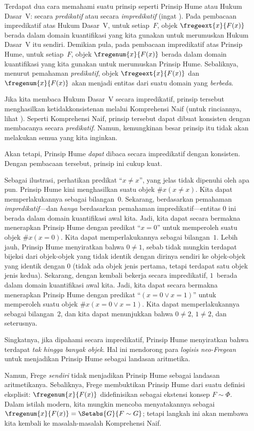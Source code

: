 \documentclass[../../../include/open-logic-section]{subfiles}
\begin{document}
Terdapat dua cara memahami suatu prinsip seperti Prinsip Hume atau Hukum
Dasar~V: secara \emph{predikatif} atau secara \emph{impredikatif} (ingat
). Pada pembacaan impredikatif atas Hukum
Dasar~V, untuk setiap~$F$, objek $\fregeext{x}{F(x)}$ berada dalam domain
kuantifikasi yang kita gunakan untuk merumuskan Hukum Dasar~V itu sendiri.
Demikian pula, pada pembacaan impredikatif atas Prinsip Hume, untuk
setiap~$F$, objek $\fregenum{x}{F(x)}$ berada dalam domain kuantifikasi yang
kita gunakan untuk merumuskan Prinsip Hume. Sebaliknya, menurut pemahaman
\emph{predikatif}, objek $\fregeext{x}{F(x)}$ dan~$\fregenum{x}{F(x)}$ akan
menjadi entitas dari suatu domain yang \emph{berbeda}.

Jika kita membaca Hukum Dasar~V secara impredikatif, prinsip tersebut
menghasilkan ketidakkonsistenan melalui Komprehensi Naif (untuk rinciannya,
lihat ). Seperti Komprehensi Naif, prinsip tersebut
dapat dibuat konsisten dengan membacanya secara \emph{predikatif}. Namun,
kemungkinan besar prinsip itu tidak akan melakukan semua yang kita inginkan.

Akan tetapi, Prinsip Hume \emph{dapat} dibaca secara impredikatif dengan
konsisten. Dengan pembacaan tersebut, prinsip ini cukup kuat.

Sebagai ilustrasi, perhatikan predikat ``$x \neq x$'', yang jelas tidak
dipenuhi oleh apa pun. Prinsip Hume kini menghasilkan suatu objek
$\# x( x\neq x)$. Kita dapat memperlakukannya sebagai bilangan~$0$.
Sekarang, berdasarkan pemahaman \emph{impredikatif}---dan \emph{hanya}
berdasarkan pemahaman impredikatif---entitas $0$ ini berada dalam domain
kuantifikasi awal kita. Jadi, kita dapat secara bermakna menerapkan Prinsip
Hume dengan predikat ``$x = 0$'' untuk memperoleh suatu objek
$\#x (x = 0)$. Kita dapat memperlakukannya sebagai bilangan~$1$. Lebih jauh,
Prinsip Hume menyiratkan bahwa $0 \neq 1$, sebab tidak mungkin terdapat
bijeksi dari objek-objek yang tidak identik dengan dirinya sendiri ke
objek-objek yang identik dengan $0$ (tidak ada objek jenis pertama, tetapi
terdapat satu objek jenis kedua). Sekarang, dengan kembali bekerja secara
impredikatif, $1$~berada dalam domain kuantifikasi awal kita. Jadi, kita dapat
secara bermakna menerapkan Prinsip Hume dengan predikat
``$(x = 0 \lor x = 1)$'' untuk memperoleh suatu objek
$\#x(x = 0 \lor x = 1)$. Kita dapat memperlakukannya sebagai bilangan~$2$,
dan kita dapat menunjukkan bahwa $0\neq 2$, $1 \neq 2$, dan seterusnya.

Singkatnya, jika dipahami secara impredikatif, Prinsip Hume menyiratkan bahwa
terdapat \emph{tak hingga banyak objek}. Hal ini mendorong para
\emph{logisis neo-Fregean} untuk menjadikan Prinsip Hume sebagai landasan
aritmetika.

Namun, Frege \emph{sendiri} tidak menjadikan Prinsip Hume sebagai landasan
aritmetikanya. Sebaliknya, Frege membuktikan Prinsip Hume dari suatu definisi
eksplisit: $\fregenum{x}{F(x)}$ didefinisikan sebagai ekstensi konsep
$F \sim \Phi$. Dalam istilah modern, kita mungkin mencoba menyatakannya
sebagai $\fregenum{x}{F(x)} = \Setabs{G}{F \sim G}$; tetapi langkah ini akan
membawa kita kembali ke masalah-masalah Komprehensi Naif.
\end{document}
